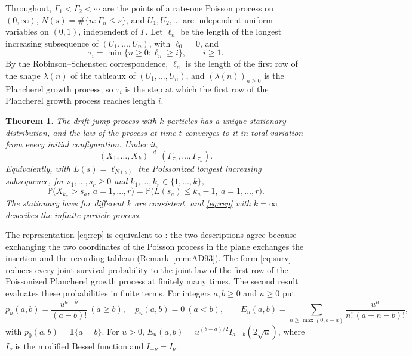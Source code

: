 \documentclass[11pt]{amsart}
\newtheorem{theorem}{Theorem}[section]
\theoremstyle{remark}
\numberwithin{equation}{section}
\newcommand{\Pp}{\mathbb P}
\begin{document}
Throughout, $\Gamma_1<\Gamma_2<\cdots$ are the points of a rate-one Poisson process on $(0,\infty)$, $N(s)=\#\{n:\Gamma_n\le s\}$, and $U_1,U_2,\dots$ are independent uniform variables on $(0,1)$, independent of $\Gamma$. Let $\ell_n$ be the length of the longest increasing subsequence of $(U_1,\dots,U_n)$, with $\ell_0=0$, and
\[
\tau_i=\min\{n\ge0:\ell_n\ge i\},\qquad i\ge1 .
\]
By the Robinson--Schensted correspondence, $\ell_n$ is the length of the first row of the shape $\lambda(n)$ of the tableaux of $(U_1,\dots,U_n)$, and $(\lambda(n))_{n\ge0}$ is the Plancherel growth process; so $\tau_i$ is the step at which the first row of the Plancherel growth process reaches length $i$.

\begin{theorem}\label{thm:rep}
The drift-jump process with $k$ particles has a unique stationary distribution, and the law of the process at time $t$ converges to it in total variation from every initial configuration. Under it,
\begin{equation}\label{eq:rep}
(X_1,\dots,X_k)\overset{d}{=}(\Gamma_{\tau_1},\dots,\Gamma_{\tau_k}).
\end{equation}
Equivalently, with $L(s)=\ell_{N(s)}$ the Poissonized longest increasing subsequence, for $s_1,\dots,s_r\ge0$ and $k_1,\dots,k_r\in\{1,\dots,k\}$,
\begin{equation}\label{eq:surv}
\Pp\bigl(X_{k_a}>s_a,\ a=1,\dots,r\bigr)=\Pp\bigl(L(s_a)\le k_a-1,\ a=1,\dots,r\bigr).
\end{equation}
The stationary laws for different $k$ are consistent, and \eqref{eq:rep} with $k=\infty$ describes the infinite particle process.
\end{theorem}

The representation \eqref{eq:rep} is equivalent to \cite[(42)]{AD93}: the two descriptions agree because exchanging the two coordinates of the Poisson process in the plane exchanges the insertion and the recording tableau (Remark~\ref{rem:AD93}). The form \eqref{eq:surv} reduces every joint survival probability to the joint law of the first row of the Poissonized Plancherel growth process at finitely many times. The second result evaluates these probabilities in finite terms. For integers $a,b\ge0$ and $u\ge0$ put
\begin{equation}\label{eq:E}
p_u(a,b)=\frac{u^{a-b}}{(a-b)!}\ (a\ge b),\quad p_u(a,b)=0\ (a<b),\qquad E_u(a,b)=\sum_{n\ge\max(0,b-a)}\frac{u^n}{n!\,(a+n-b)!},
\end{equation}
with $p_0(a,b)=\mathbf 1\{a=b\}$. For $u>0$, $E_u(a,b)=u^{(b-a)/2}I_{a-b}(2\sqrt u)$, where $I_\nu$ is the modified Bessel function and $I_{-\nu}=I_\nu$.
\end{document}
